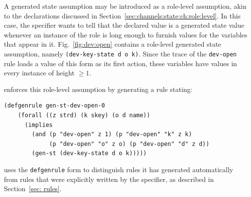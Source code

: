 A generated state assumption may be introduced as a role-level
assumption, akin to the declarations discussed in
Section~\ref{sec:channels:state:ch:role:level}.  In this case, the
specifier wants to tell {\cpsa} that the declared value is a generated
state value whenever an instance of the role is long enough to furnish
values for the variables that appear in it.  Fig.~\ref{fig:dev:open}
contains a role-level generated state assumption, namely
\texttt{(dev-key-state d o k)}.  Since the trace of the
\texttt{dev-open} rule loads a value of this form as its first action,
these variables have values in every instance of height $\ge 1$.

{\cpsa} enforces this role-level assumption by generating a rule
stating:
%
{\small
\begin{verbatim}(defgenrule gen-st-dev-open-0
    (forall ((z strd) (k skey) (o d name))
      (implies
        (and (p "dev-open" z 1) (p "dev-open" "k" z k)
             (p "dev-open" "o" z o) (p "dev-open" "d" z d))
        (gen-st (dev-key-state d o k)))))
\end{verbatim}
}
%
\noindent{\cpsa} uses the \texttt{defgenrule} form to distinguish
rules it has generated automatically from rules that were explicitly
written by the specifier, as described in Section~\ref{sec: rules}.

